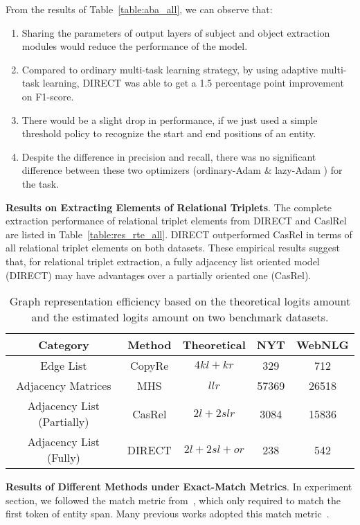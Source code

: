 \documentclass[11pt,a4paper]{article}
\begin{document}
From the results of Table~\ref{table:aba_all}, we can observe that:
\begin{enumerate}
\item Sharing the parameters of output layers of subject and object extraction modules would reduce the performance of the model.
\item Compared to ordinary multi-task learning strategy, by using adaptive multi-task learning, DIRECT was able to get a 1.5 percentage point improvement on F1-score.
\item There would be a slight drop in performance, if we just used a simple threshold policy to recognize the start and end positions of an entity.
\item Despite the difference in precision and recall, there was
 no significant difference between these two optimizers (ordinary-Adam \& lazy-Adam ) for the task.
\end{enumerate} 
 
\textbf{Results on Extracting Elements of Relational Triplets}. The complete extraction performance of relational triplet elements from DIRECT and CaslRel are listed in Table~\ref{table:res_rte_all}. DIRECT outperformed CasRel in terms of all relational triplet elements on both datasets. These empirical results suggest that, for relational triplet extraction, a fully adjacency list oriented model (DIRECT) may have advantages over a partially oriented one (CasRel).

\begin{table*}[htbp]
\centering
\begin{tabular}{ccccc}
\toprule[1pt]
Category & Method & Theoretical & NYT & WebNLG\\
\hline
Edge List & CopyRe & $4kl+kr$ & 329 & 712 \\
Adjacency Matrices & MHS &$llr$& 57369 & 26518 \\
Adjacency List (Partially)& CasRel & $2l+2slr$ & 3084 & 15836 \\
\hline
Adjacency List (Fully)& DIRECT & $2l+2sl+or$ & 238 & 542 \\
\bottomrule[1pt]
\end{tabular}
\caption{Graph representation efficiency based on the theoretical logits amount and the estimated logits amount on two benchmark datasets.}
\label{tab:logit1_all}
\end{table*}

\textbf{Results of Different Methods under Exact-Match Metrics}. In experiment section, we followed the match metric from~\cite{zeng2018extracting}, which only required to match the first token of entity span. Many previous works adopted this match metric~\cite{fu2019graphrel,zeng2019learning,wei2020novel}. 
\end{document}
